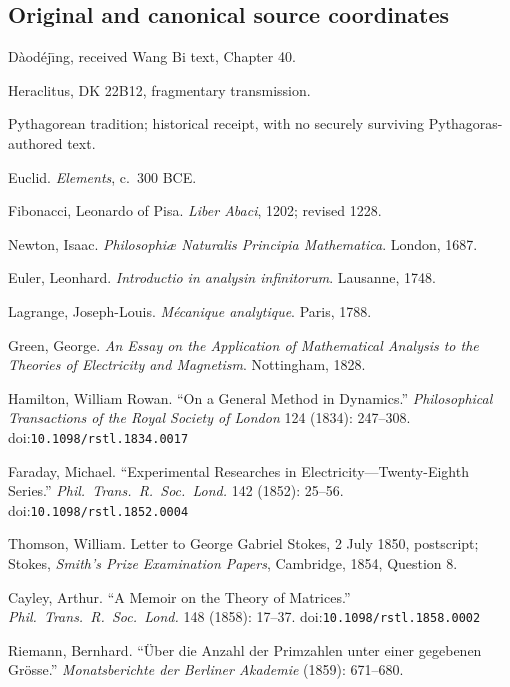 \documentclass[11pt,a4paper]{article}
\theoremstyle{plain}
\theoremstyle{definition}
\theoremstyle{remark}
\begin{document}
\subsection{Original and canonical source coordinates}
{\footnotesize\setlength{\parskip}{2pt}
\begin{description}[leftmargin=1.1cm,labelwidth=1.0cm,labelsep=0.1cm,itemsep=1pt,font=\normalfont\bfseries]
\item[H01] D\`aod\'ej\={\i}ng, received Wang Bi text, Chapter 40.
\item[H02] Heraclitus, DK 22B12, fragmentary transmission.
\item[H03] Pythagorean tradition; historical receipt, with no securely surviving Pythagoras-authored text.
\item[H04] Euclid. \emph{Elements}, c.\ 300 BCE.
\item[H05] Fibonacci, Leonardo of Pisa. \emph{Liber Abaci}, 1202; revised 1228.
\item[H06] Newton, Isaac. \emph{Philosophi\ae{} Naturalis Principia Mathematica}. London, 1687.
\item[H07] Euler, Leonhard. \emph{Introductio in analysin infinitorum}. Lausanne, 1748.
\item[H08] Lagrange, Joseph-Louis. \emph{M\'ecanique analytique}. Paris, 1788.
\item[H09] Green, George. \emph{An Essay on the Application of Mathematical Analysis to the Theories of Electricity and Magnetism}. Nottingham, 1828.
\item[H10] Hamilton, William Rowan. ``On a General Method in Dynamics.'' \emph{Philosophical Transactions of the Royal Society of London} 124 (1834): 247--308. doi:\nolinkurl{10.1098/rstl.1834.0017}
\item[H11] Faraday, Michael. ``Experimental Researches in Electricity---Twenty-Eighth Series.'' \emph{Phil.\ Trans.\ R.\ Soc.\ Lond.} 142 (1852): 25--56. doi:\nolinkurl{10.1098/rstl.1852.0004}
\item[H12] Thomson, William. Letter to George Gabriel Stokes, 2 July 1850, postscript; Stokes, \emph{Smith's Prize Examination Papers}, Cambridge, 1854, Question 8.
\item[H13] Cayley, Arthur. ``A Memoir on the Theory of Matrices.'' \emph{Phil.\ Trans.\ R.\ Soc.\ Lond.} 148 (1858): 17--37. doi:\nolinkurl{10.1098/rstl.1858.0002}
\item[H14] Riemann, Bernhard. ``\"Uber die Anzahl der Primzahlen unter einer gegebenen Gr\"osse.'' \emph{Monatsberichte der Berliner Akademie} (1859): 671--680.

\end{description}}
\end{document}

